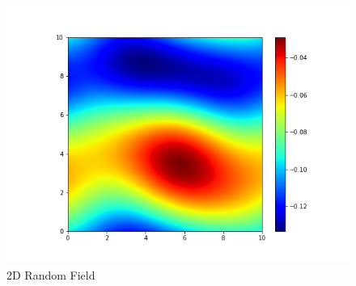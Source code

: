 \documentclass{article}
\begin{document}
\begin{figure}[H]
\begin{minipage}[t]{0.3\textwidth}
    \includegraphics[width=\textwidth]{./pics/2D_RF_256_10.0_10_1.png}  %
    \caption*{$\nu=10, \kappa=1$}
  \end{minipage}

    \caption{2D Random Field}
    \label{2drf}
\end{figure}
\end{document}
